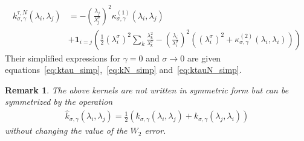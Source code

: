 \documentclass[11pt]{article}
\newtheorem{remark}{Remark}
\begin{document}
\begin{repeatcor1}
\begin{align*}
\\
k_{\sigma, \gamma}^{\tau, N} (\lambda_i, \lambda_j) &= 
- \left( \frac{\lambda_j}{\lambda^\sigma_j}\right)^2  \kappa^{(1)}_{\sigma, \gamma}(\lambda_i, \lambda_j) \\ 
&+ \nonumber \mathbf{1}_{i=j} \left(\frac{1}{2}(\lambda^\sigma_i)^2 \sum_k \frac{\lambda_k^2}{\lambda^\sigma_k} - \left( \frac{\lambda_i}{\lambda^\sigma_i}\right)^2\left((\lambda^\sigma_i)^2  + \kappa^{(2)}_{\sigma, \gamma}(\lambda_i, \lambda_i)\right) \right)
\end{align*}
Their simplified expressions for $\gamma = 0$ and $\sigma \to 0$ are given equations~\eqref{eq:ktau_simp},~\eqref{eq:kN_simp} and~\eqref{eq:ktauN_simp}. 
\end{repeatcor1}
\begin{remark}
The above kernels are not written in symmetric form but can be symmetrized by the operation 
\begin{align} \label{eq:sym}
    \hat k_{\sigma, \gamma} (\lambda_i, \lambda_j)  = \frac{1}{2} \left(k_{\sigma, \gamma} (\lambda_i, \lambda_j)  + k_{\sigma, \gamma} (\lambda_j, \lambda_i)\right)
\end{align}
without changing the value of the $W_2$ error.
\end{remark}
\end{document}
